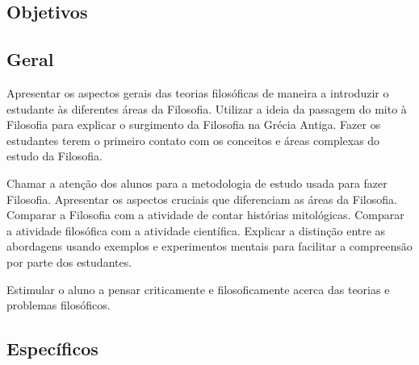 \documentclass[
	article,			%
	12pt,				%
	twoside,			%
	a4paper,			%
	english,			%
	brazil,				%
	sumario=tradicional
]{plano}
\begin{document}

\frenchspacing



\imprimirletterUFSC





\textual
\pagestyle{notasUFSC}



\begin{snugshade}
	\section{Objetivos} %
\end{snugshade}

\subsection{Geral} %
%

Apresentar os aspectos gerais das teorias filosóficas de maneira a introduzir o estudante às diferentes áreas da Filosofia. Utilizar a ideia da passagem do mito à Filosofia para explicar o surgimento da Filosofia na Grécia Antiga. Fazer os estudantes terem o primeiro contato com os conceitos e áreas complexas do estudo da Filosofia.

Chamar a atenção dos alunos para a metodologia de estudo usada para fazer Filosofia. Apresentar os aspectos cruciais que diferenciam as áreas da Filosofia. Comparar a Filosofia com a atividade de contar histórias mitológicas. Comparar a atividade filosófica com a atividade científica. Explicar a distinção entre as abordagens usando exemplos e experimentos mentais para facilitar a compreensão por parte dos estudantes.

Estimular o aluno a pensar criticamente e filosoficamente acerca das teorias e problemas filosóficos.

\subsection{Específicos} %
\end{document}
